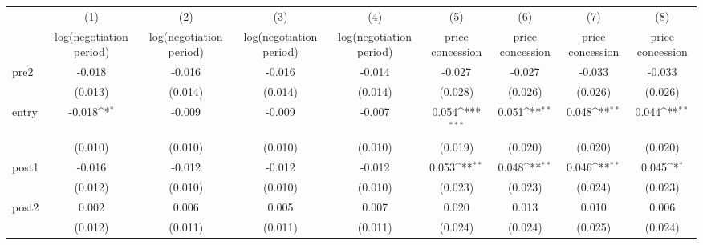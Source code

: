 {
\def\sym#1{\ifmmode^{#1}\else\(^{#1}\)\fi}
\begin{adjustbox}{max width=\textwidth}
\begin{tabular}{l*{8}{c}}
\toprule
            &\multicolumn{1}{c}{(1)}&\multicolumn{1}{c}{(2)}&\multicolumn{1}{c}{(3)}&\multicolumn{1}{c}{(4)}&\multicolumn{1}{c}{(5)}&\multicolumn{1}{c}{(6)}&\multicolumn{1}{c}{(7)}&\multicolumn{1}{c}{(8)}\\
            &\multicolumn{1}{c}{log(negotiation period)}&\multicolumn{1}{c}{log(negotiation period)}&\multicolumn{1}{c}{log(negotiation period)}&\multicolumn{1}{c}{log(negotiation period)}&\multicolumn{1}{c}{price concession}&\multicolumn{1}{c}{price concession}&\multicolumn{1}{c}{price concession}&\multicolumn{1}{c}{price concession}\\
\midrule
pre2        &      -0.018         &      -0.016         &      -0.016         &      -0.014         &      -0.027         &      -0.027         &      -0.033         &      -0.033         \\
            &     (0.013)         &     (0.014)         &     (0.014)         &     (0.014)         &     (0.028)         &     (0.026)         &     (0.026)         &     (0.026)         \\
\addlinespace
entry       &      -0.018\sym{*}  &      -0.009         &      -0.009         &      -0.007         &       0.054\sym{***}&       0.051\sym{**} &       0.048\sym{**} &       0.044\sym{**} \\
            &     (0.010)         &     (0.010)         &     (0.010)         &     (0.010)         &     (0.019)         &     (0.020)         &     (0.020)         &     (0.020)         \\
\addlinespace
post1       &      -0.016         &      -0.012         &      -0.012         &      -0.012         &       0.053\sym{**} &       0.048\sym{**} &       0.046\sym{**} &       0.045\sym{*}  \\
            &     (0.012)         &     (0.010)         &     (0.010)         &     (0.010)         &     (0.023)         &     (0.023)         &     (0.024)         &     (0.023)         \\
\addlinespace
post2       &       0.002         &       0.006         &       0.005         &       0.007         &       0.020         &       0.013         &       0.010         &       0.006         \\
            &     (0.012)         &     (0.011)         &     (0.011)         &     (0.011)         &     (0.024)         &     (0.024)         &     (0.025)         &     (0.024)         \\

\end{tabular}
\end{adjustbox}}
